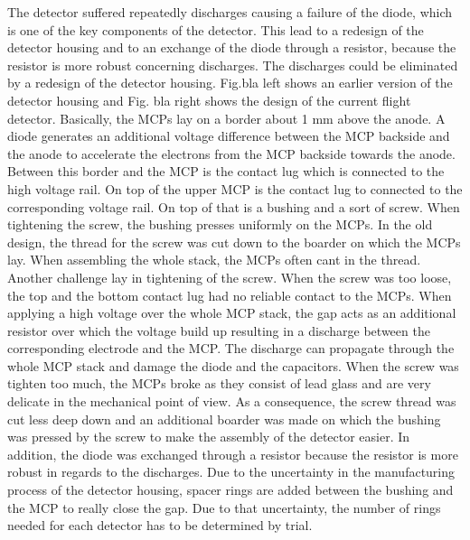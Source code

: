 	
	The detector suffered repeatedly discharges causing a failure of the diode, which is one of the key components of the detector. This lead to a redesign of the detector housing and to an exchange of the diode through a resistor, because the resistor is more robust concerning discharges. %
	The discharges could be eliminated by a redesign of the detector housing. %
	Fig.bla left shows an earlier version of the detector housing and Fig. bla right shows the design of the current flight detector.
	Basically, the MCPs lay on a border about 1 mm above the anode. %
	A diode generates an additional voltage difference between the MCP backside and the anode to accelerate the electrons from the MCP backside towards the anode. Between this border and the MCP is the contact lug which is connected to the high voltage rail. On top of the upper MCP is the contact lug to connected to the corresponding voltage rail. On top of that is a bushing and a sort of screw. When tightening the screw, the bushing presses uniformly on the MCPs. In the old design, the thread for the screw was cut down to the boarder on which the MCPs lay. When assembling the whole stack, the MCPs often cant in the thread. Another challenge lay in tightening of the screw. When the screw was too loose, the top and the bottom contact lug had no reliable contact to the MCPs. When applying a high voltage over the whole MCP stack, the gap acts as an additional resistor over which the voltage build up resulting in a discharge between the corresponding electrode and the MCP. The discharge can propagate through the whole MCP stack and damage the diode and the capacitors. When the screw was tighten too much, the MCPs broke as they consist of lead glass and are very delicate in the mechanical point of view. As a consequence, the screw thread was cut less deep down and an additional boarder was made on which the bushing was pressed by the screw to make the assembly of the detector easier. In addition, the diode was exchanged through a resistor because the resistor is more robust in regards to the discharges. Due to the uncertainty in the manufacturing process of the detector housing, spacer rings are added between the bushing and the MCP to really close the gap. Due to that uncertainty, the number of rings needed for each detector has to be determined by trial.
	

